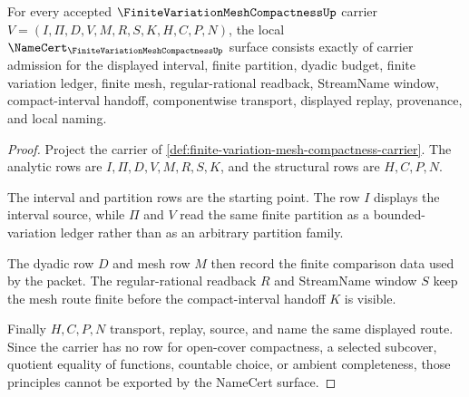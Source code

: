 \begin{theorem}
\label{thm:finite-variation-mesh-compactness-namecert-obligations}
For every accepted $\FiniteVariationMeshCompactnessUp$ carrier $V=(I,\Pi,D,V,M,R,S,K,H,C,P,N)$, the local $\NameCert_{\FiniteVariationMeshCompactnessUp}$ surface consists exactly of carrier admission for the displayed interval, finite partition, dyadic budget, finite variation ledger, finite mesh, regular-rational readback, StreamName window, compact-interval handoff, componentwise transport, displayed replay, provenance, and local naming.
\end{theorem}
\begin{proof}
Project the carrier of \autoref{def:finite-variation-mesh-compactness-carrier}. The analytic rows are $I,\Pi,D,V,M,R,S,K$, and the structural rows are $H,C,P,N$.

The interval and partition rows are the starting point. The row $I$ displays the interval source, while $\Pi$ and $V$ read the same finite partition as a bounded-variation ledger rather than as an arbitrary partition family.

The dyadic row $D$ and mesh row $M$ then record the finite comparison data used by the packet. The regular-rational readback $R$ and StreamName window $S$ keep the mesh route finite before the compact-interval handoff $K$ is visible.

Finally $H,C,P,N$ transport, replay, source, and name the same displayed route. Since the carrier has no row for open-cover compactness, a selected subcover, quotient equality of functions, countable choice, or ambient completeness, those principles cannot be exported by the NameCert surface.
\end{proof}

